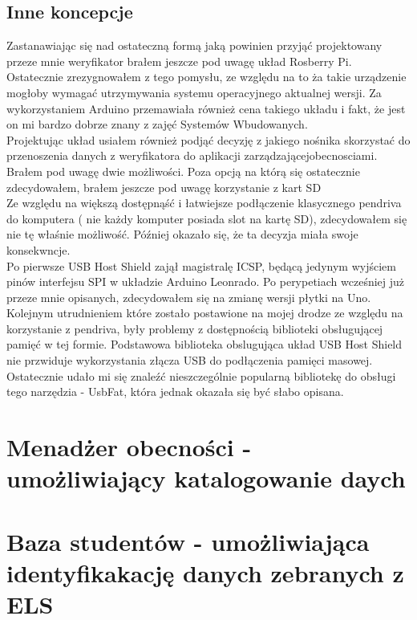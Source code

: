 \documentclass[declaration,shortabstract, mgr]{iithesis}
\begin{document}
\subsection{Inne koncepcje}
\indent Zastanawiając się nad ostateczną formą jaką powinien przyjąć projektowany przeze mnie weryfikator brałem jeszcze pod uwagę układ Rosberry Pi. Ostatecznie zrezygnowałem z tego pomysłu, ze względu na to ża takie urządzenie mogłoby wymagać utrzymywania systemu operacyjnego aktualnej wersji. Za wykorzystaniem Arduino przemawiała również cena takiego układu i fakt, że jest on mi bardzo dobrze znany z zajęć Systemów Wbudowanych.\\
\indent Projektując układ usiałem również podjąć decyzję z jakiego nośnika skorzystać do przenoszenia danych z weryfikatora do aplikacji zarządzającejobecnosciami. Brałem pod uwagę dwie możliwości. Poza opcją na którą się ostatecznie zdecydowałem, brałem jeszcze pod uwagę korzystanie z kart SD \\
\indent Ze względu na większą dostępnąść i łatwiejsze podłączenie klasycznego pendriva do komputera ( nie każdy komputer posiada slot na kartę SD), zdecydowałem się nie tę właśnie możliwość.  Później okazało się, że ta decyzja miała swoje konsekwncje.\\
\indent Po pierwsze USB Host Shield zajął magistralę ICSP, będącą jedynym wyjściem pinów interfejsu SPI w układzie Arduino Leonrado. Po perypetiach wcześniej już przeze mnie opisanych, zdecydowałem się na zmianę wersji płytki na Uno. \\
\indent Kolejnym utrudnieniem które zostało postawione na mojej drodze ze względu na korzystanie z pendriva, były problemy z dostępnością biblioteki obsługującej pamięć w tej formie. Podstawowa biblioteka obslugująca układ USB Host Shield nie przwiduje wykorzystania złącza USB do podłączenia pamięci masowej. \\
\indent Ostatecznie udało mi się znaleźć nieszczególnie popularną bibliotekę do obsługi tego narzędzia - UsbFat, która jednak okazała się być słabo opisana.
\section{Menadżer obecności - umożliwiający katalogowanie daych}
\section{Baza studentów - umożliwiająca identyfikakację danych zebranych z ELS}
\end{document}
